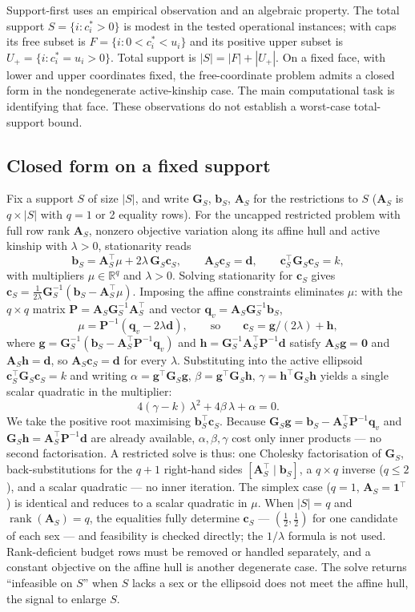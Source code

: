 \documentclass[11pt]{article}
\newcommand{\tp}{^{\top}}
\newcommand{\bc}{\mathbf{c}}
\newcommand{\bb}{\mathbf{b}}
\newcommand{\bG}{\mathbf{G}}
\newcommand{\bA}{\mathbf{A}}
\newcommand{\bd}{\mathbf{d}}
\begin{document}
Support-first uses an empirical observation and an algebraic property. The total support $S=\{i:c_i^*>0\}$ is modest in the tested operational instances; with caps its free subset is $F=\{i:0<c_i^*<u_i\}$ and its positive upper subset is $U_+=\{i:c_i^*=u_i>0\}$. Total support is $|S|=|F|+|U_+|$. On a fixed face, with lower and upper coordinates fixed, the free-coordinate problem admits a closed form in the nondegenerate active-kinship case. The main computational task is identifying that face. These observations do not establish a worst-case total-support bound.

\subsection{Closed form on a fixed support}

Fix a support $S$ of size $|S|$, and write $\bG_S$, $\bb_S$, $\bA_S$ for the restrictions to $S$ ($\bA_S$ is $q\times|S|$ with $q=1$ or 2 equality rows). For the uncapped restricted problem with full row rank $\bA_S$, nonzero objective variation along its affine hull and active kinship with $\lambda>0$, stationarity reads
\[
  \bb_S = \bA_S\tp\mu + 2\lambda\,\bG_S\bc_S,\qquad \bA_S\bc_S=\bd,\qquad \bc_S\tp\bG_S\bc_S=k,
\]
with multipliers $\mu\in\mathbb{R}^q$ and $\lambda>0$. Solving stationarity for $\bc_S$ gives $\bc_S=\tfrac{1}{2\lambda}\bG_S^{-1}(\bb_S-\bA_S\tp\mu)$. Imposing the affine constraints eliminates $\mu$: with the $q\times q$ matrix $\mathbf{P}=\bA_S\bG_S^{-1}\bA_S\tp$ and vector $\mathbf{q}_v=\bA_S\bG_S^{-1}\bb_S$,
\[
  \mu=\mathbf{P}^{-1}(\mathbf{q}_v-2\lambda\bd),\qquad\text{so}\qquad \bc_S=\mathbf{g}/(2\lambda)+\mathbf{h},
\]
where $\mathbf{g}=\bG_S^{-1}(\bb_S-\bA_S\tp\mathbf{P}^{-1}\mathbf{q}_v)$ and $\mathbf{h}=\bG_S^{-1}\bA_S\tp\mathbf{P}^{-1}\bd$ satisfy $\bA_S\mathbf{g}=\mathbf{0}$ and $\bA_S\mathbf{h}=\bd$, so $\bA_S\bc_S=\bd$ for every $\lambda$. Substituting into the active ellipsoid $\bc_S\tp\bG_S\bc_S=k$ and writing $\alpha=\mathbf{g}\tp\bG_S\mathbf{g}$, $\beta=\mathbf{g}\tp\bG_S\mathbf{h}$, $\gamma=\mathbf{h}\tp\bG_S\mathbf{h}$ yields a single scalar quadratic in the multiplier:
\[
  4(\gamma-k)\,\lambda^2 + 4\beta\,\lambda + \alpha = 0.
\]
We take the positive root maximising $\bb_S\tp\bc_S$. Because $\bG_S\mathbf{g}=\bb_S-\bA_S\tp\mathbf{P}^{-1}\mathbf{q}_v$ and $\bG_S\mathbf{h}=\bA_S\tp\mathbf{P}^{-1}\bd$ are already available, $\alpha,\beta,\gamma$ cost only inner products --- no second factorisation. A restricted solve is thus: one Cholesky factorisation of $\bG_S$, back-substitutions for the $q+1$ right-hand sides $[\bA_S\tp\mid\bb_S]$, a $q\times q$ inverse ($q\le2$), and a scalar quadratic --- no inner iteration. The simplex case ($q=1$, $\bA_S=\mathbf{1}\tp$) is identical and reduces to a scalar quadratic in $\mu$. When $|S|=q$ and $\operatorname{rank}(\bA_S)=q$, the equalities fully determine $\bc_S$ --- $(\tfrac12,\tfrac12)$ for one candidate of each sex --- and feasibility is checked directly; the $1/\lambda$ formula is not used. Rank-deficient budget rows must be removed or handled separately, and a constant objective on the affine hull is another degenerate case. The solve returns ``infeasible on $S$'' when $S$ lacks a sex or the ellipsoid does not meet the affine hull, the signal to enlarge $S$.
\end{document}
